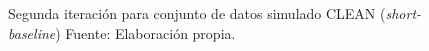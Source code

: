 \begin{figure}[!ht]
 \caption[Segunda iteración para conjunto de datos simulado CLEAN (\textit{short-baseline})]{Segunda iteración para conjunto de datos simulado CLEAN (\textit{short-baseline}) Fuente: Elaboración propia.}
 \label{fig:short_sim_p1}
\end{figure}

